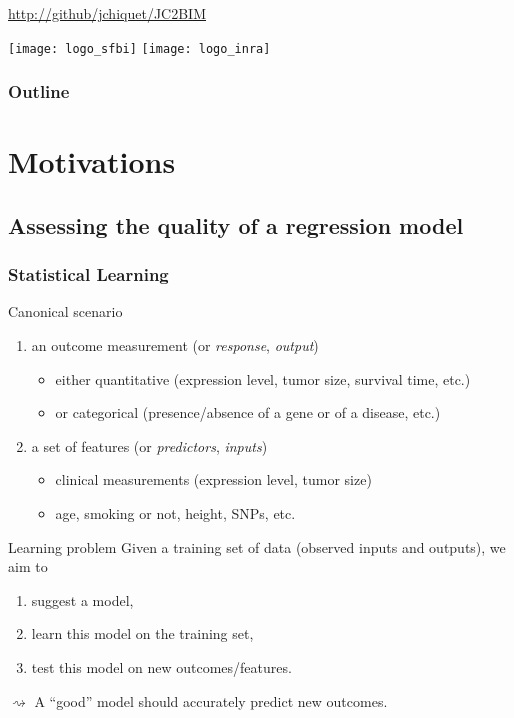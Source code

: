 \documentclass{beamer}\usepackage[]{graphicx}\usepackage[]{color}
\title{\currentCourse}
\subtitle{\huge\currentChapter\normalsize}
\institute{\currentInstitute}
\date{\currentDate}
\newcommand{\dotitlepage}{%
  \begin{frame}
    \titlepage
    \vfill
    \begin{center}
        \scriptsize\url{http://github/jchiquet/JC2BIM}
    \end{center}
    \vfill
    \texttt{[image: logo\_sfbi]}\hfill
    \texttt{[image: logo\_inra]}
  \end{frame}
}
\newcommand{\dotoc}{%
  \begin{frame}
    \frametitle{Outline}
    \tableofcontents[currentsection,
    sectionstyle=show/show,
    subsectionstyle=hide]
  \end{frame}
}
\begin{document}
\dotitlepage

\dotoc

\section{Motivations}


\subsection{Assessing the quality of a regression model}

\begin{frame}
  \frametitle{Statistical Learning}

  \begin{block}{Canonical scenario}
    \begin{enumerate}
    \item an \alert{outcome} measurement (or \emph{response}, \emph{output})
      \begin{itemize}
      \item  either   quantitative  (expression  level,   tumor  size,
        survival time, etc.)
      \item or categorical (presence/absence of a gene or of a disease, etc.)
      \end{itemize}
    \item a set of  \alert{features} (or \emph{predictors}, \emph{inputs})
      \begin{itemize}
      \item clinical measurements (expression level, tumor size)
      \item age, smoking or not, height, SNPs, etc.
      \end{itemize}
    \end{enumerate}
  \end{block}

  \vfill

  \begin{block}{Learning problem} Given a training set of data (observed
    inputs and outputs), we aim to
    \begin{enumerate}
    \item suggest a model,
    \item learn this model on the training set,
    \item test this model on new outcomes/features.
    \end{enumerate}
  \end{block}

  \vfill

  $\rightsquigarrow$   \alert{A  ``good''   model  should   accurately
    predict new outcomes.}
\end{frame}
\end{document}
